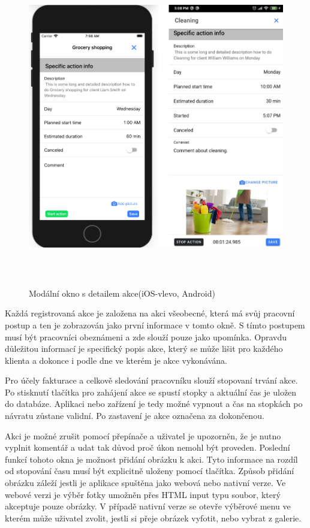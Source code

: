 \documentclass[
  biblatex,
  glossaries,
  index
]{kidiplom}
\begin{document}
\begin{figure}[H]
  	\centering
 	 \includegraphics[width=14cm,height=14cm,keepaspectratio]{actionDetail}
 	 \caption{Modální okno s detailem akce(iOS-vlevo, Android)}
 	 \label{fig:actionDetail}
\end{figure}

Každá registrovaná akce je založena na akci všeobecné, která má svůj pracovní postup a ten je zobrazován jako první informace v tomto okně. S tímto postupem musí být pracovníci obeznámeni a zde slouží pouze jako upomínka. Opravdu důležitou informací je specifický popis akce, který se může lišit pro každého klienta a dokonce i podle dne ve kterém je akce vykonávána.

Pro účely fakturace a celkově sledování pracovníku slouží stopovaní trvání akce. Po stisknutí tlačítka pro zahájení akce se spustí stopky a aktuální čas je uložen do databáze. Aplikaci nebo zařízení je tedy možné vypnout a čas na stopkách po návratu zůstane validní. Po zastavení je akce označena za dokončenou.

Akci je možné zrušit pomocí přepínače a uživatel je upozorněn, že je nutno vyplnit komentář a udat tak důvod proč úkon nemohl být proveden. Poslední funkcí tohoto okna je možnost přidání obrázku k akci. Tyto informace na rozdíl od stopování času musí být explicitně uloženy pomocí tlačítka. Způsob přidání obrázku záleží jestli je aplikace spuštěna jako webová nebo nativní verze. Ve webové verzi je výběr fotky umožněn přes HTML input typu soubor, který akceptuje pouze obrázky. V případě nativní verze se otevře výběrové menu ve kterém může uživatel zvolit, jestli si přeje obrázek vyfotit, nebo vybrat z galerie. 
\end{document}
